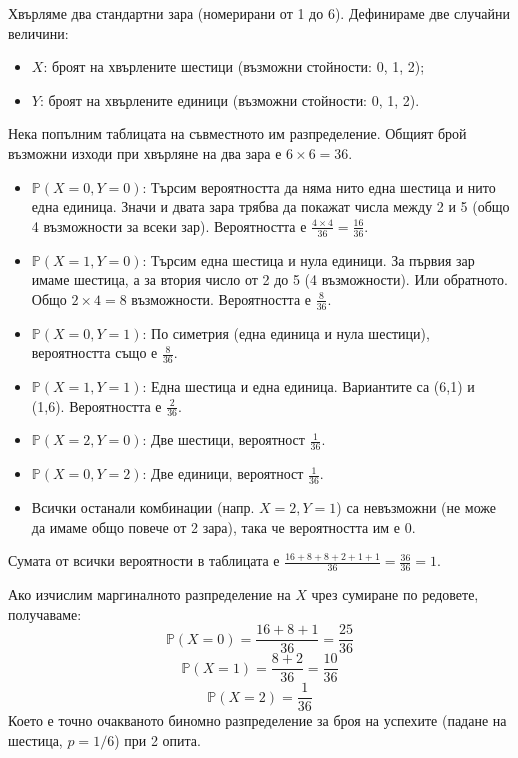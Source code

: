\begin{example}\label{ex:07-2}
Хвърляме два стандартни зара (номерирани от 1 до 6). Дефинираме две случайни величини:
\begin{itemize}
    \item $X$: броят на хвърлените шестици (възможни стойности: 0, 1, 2);
    \item $Y$: броят на хвърлените единици (възможни стойности: 0, 1, 2).
\end{itemize}

Нека попълним таблицата на съвместното им разпределение. Общият брой възможни изходи при хвърляне на два зара е $6 \times 6 = 36$.
\begin{itemize}
    \item $\mathbb{P}(X=0, Y=0)$: Търсим вероятността да няма нито една шестица и нито една единица. Значи и двата зара трябва да покажат числа между 2 и 5 (общо 4 възможности за всеки зар). Вероятността е $\frac{4 \times 4}{36} = \frac{16}{36}$.
    \item $\mathbb{P}(X=1, Y=0)$: Търсим една шестица и нула единици. За първия зар имаме шестица, а за втория число от 2 до 5 (4 възможности). Или обратното. Общо $2 \times 4 = 8$ възможности. Вероятността е $\frac{8}{36}$.
    \item $\mathbb{P}(X=0, Y=1)$: По симетрия (една единица и нула шестици), вероятността също е $\frac{8}{36}$.
    \item $\mathbb{P}(X=1, Y=1)$: Една шестица и една единица. Вариантите са (6,1) и (1,6). Вероятността е $\frac{2}{36}$.
    \item $\mathbb{P}(X=2, Y=0)$: Две шестици, вероятност $\frac{1}{36}$.
    \item $\mathbb{P}(X=0, Y=2)$: Две единици, вероятност $\frac{1}{36}$.
    \item Всички останали комбинации (напр. $X=2, Y=1$) са невъзможни (не може да имаме общо повече от 2 зара), така че вероятността им е 0.
\end{itemize}

Сумата от всички вероятности в таблицата е $\frac{16+8+8+2+1+1}{36} = \frac{36}{36} = 1$.

Ако изчислим маргиналното разпределение на $X$ чрез сумиране по редовете, получаваме:
\[
\mathbb{P}(X=0) = \frac{16+8+1}{36} = \frac{25}{36}
\]
\[
\mathbb{P}(X=1) = \frac{8+2}{36} = \frac{10}{36}
\]
\[
\mathbb{P}(X=2) = \frac{1}{36}
\]
Което е точно очакваното биномно разпределение за броя на успехите (падане на шестица, $p = 1/6$) при 2 опита.


\end{example}

